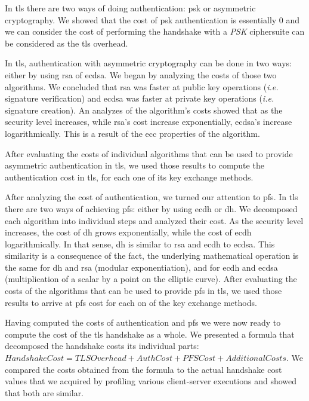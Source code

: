 In \gls{tls} there are two ways of doing authentication: \gls{psk} or asymmetric cryptography. We showed that the
cost of \gls{psk} authentication is essentially $0$ and we can consider the cost of performing the 
handshake with a \textit{PSK} ciphersuite can be considered as the \gls{tls} overhead.

In \gls{tls}, authentication with asymmetric cryptography can be done in two ways: either by using \gls{rsa}
of \gls{ecdsa}. We began by analyzing the costs of those two algorithms. We concluded that \gls{rsa} was
faster at public key operations (\textit{i.e.} signature verification) and \gls{ecdsa} was faster at private key
operations (\textit{i.e.} signature creation). An analyzes of the algorithm's costs showed that as the security level
increases, while \gls{rsa}'s cost increase exponentially, \gls{ecdsa}'s increase logarithmically. This is a result of the
\gls{ecc} properties of the algorithm.

After evaluating the costs of individual algorithms that can be used to provide asymmetric authentication in \gls{tls}, we
used those results to compute the authentication cost in \gls{tls}, for each one of its key exchange methods.

After analyzing the cost of authentication, we turned our attention to \gls{pfs}. In \gls{tls} there are two ways
of achieving \gls{pfs}: either by using \gls{ecdh} or \gls{dh}. We decomposed each algorithm into individual steps
and analyzed their cost. As the security level increases, the cost of \gls{dh} grows exponentially, while the cost
of \gls{ecdh} logarithmically. In that sense, \gls{dh} is similar to \gls{rsa} and \gls{ecdh} to \gls{ecdsa}.
This similarity is a consequence of the fact, the underlying mathematical operation is the same for \gls{dh} and
\gls{rsa} (modular exponentiation), and for \gls{ecdh} and \gls{ecdsa} (multiplication of a scalar by a point on 
the elliptic curve). After evaluating the costs of the algorithms that can be used to provide \gls{pfs} in \gls{tls}, we used those results
to arrive at \gls{pfs} cost for each on of the key exchange methods.

Having computed the costs of authentication and \gls{pfs} we were now ready to compute the cost of the \gls{tls} handshake
as a whole. We presented a formula that decomposed the handshake costs its individual parts: $Handshake Cost = TLS Overhead + Auth Cost + PFS Cost + Additional Costs$. 
We compared the costs
obtained from the formula to the actual handshake cost values that we acquired by profiling various client-server
executions and showed that both are similar.

